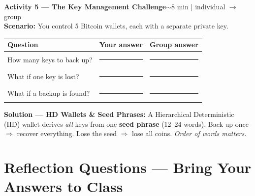\documentclass[11pt,a4paper]{article}
\newcommand{\activitybox}[3]{%
  \noindent\colorbox{mllavender4}{\parbox{\dimexpr\linewidth-2\fboxsep}{%
    \textbf{\color{mlpurple}#1}\hfill\textcolor{mlgray}{\small #2}\\[2pt]#3%
  }}\par\vspace{4pt}%
}
\begin{document}
\activitybox{Activity 5 --- The Key Management Challenge}{$\sim$8 min | individual $\to$ group}{%
\textbf{Scenario:} You control 5 Bitcoin wallets, each with a separate private key.

\vspace{3pt}
\begin{center}
\renewcommand{\arraystretch}{1.3}
\begin{tabular}{|p{4.5cm}|p{4.5cm}|p{3.6cm}|}
\hline
\textbf{Question} & \textbf{Your answer} & \textbf{Group answer} \\
\hline
How many keys to back up? & \rule{4.2cm}{0.3pt} & \rule{3.3cm}{0.3pt} \\[6pt]
\hline
What if one key is lost? & \rule{4.2cm}{0.3pt} & \rule{3.3cm}{0.3pt} \\[6pt]
\hline
What if a backup is found? & \rule{4.2cm}{0.3pt} & \rule{3.3cm}{0.3pt} \\[6pt]
\hline
\end{tabular}
\end{center}

\vspace{2pt}
\textbf{Solution --- HD Wallets \& Seed Phrases:} A Hierarchical Deterministic (HD) wallet derives
\emph{all} keys from one \textbf{seed phrase} (12--24 words). Back up once $\Rightarrow$ recover
everything. Lose the seed $\Rightarrow$ lose all coins. \textit{Order of words matters.}
}

\vspace{4pt}

\section{Reflection Questions --- Bring Your Answers to Class}
\end{document}
